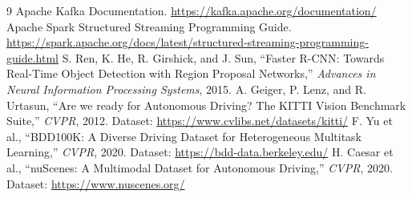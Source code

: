 \documentclass[10pt,twocolumn]{article}
\begin{document}
\begin{thebibliography}{9}
 Apache Kafka Documentation. \url{https://kafka.apache.org/documentation/}
 Apache Spark Structured Streaming Programming Guide. \url{https://spark.apache.org/docs/latest/structured-streaming-programming-guide.html}
 S. Ren, K. He, R. Girshick, and J. Sun, ``Faster R-CNN: Towards Real-Time Object Detection with Region Proposal Networks,'' \emph{Advances in Neural Information Processing Systems}, 2015.
 A. Geiger, P. Lenz, and R. Urtasun, ``Are we ready for Autonomous Driving? The KITTI Vision Benchmark Suite,'' \emph{CVPR}, 2012. Dataset: \url{https://www.cvlibs.net/datasets/kitti/}
 F. Yu et al., ``BDD100K: A Diverse Driving Dataset for Heterogeneous Multitask Learning,'' \emph{CVPR}, 2020. Dataset: \url{https://bdd-data.berkeley.edu/}
 H. Caesar et al., ``nuScenes: A Multimodal Dataset for Autonomous Driving,'' \emph{CVPR}, 2020. Dataset: \url{https://www.nuscenes.org/}
\end{thebibliography}
\end{document}

